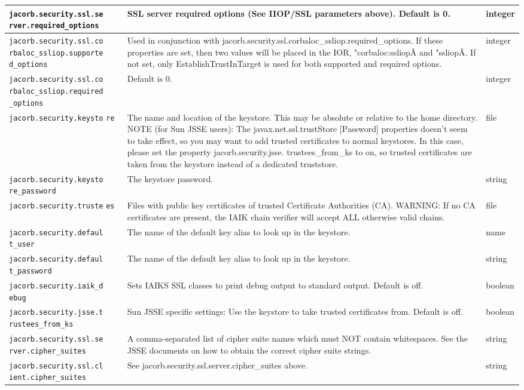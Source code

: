 \begin{small}
\begin{longtable}{|p{5cm}|p{9cm}|p{2cm}|}
\hline
\verb"jacorb.security.ssl.se"
\verb"rver.required_options" & SSL server required options (See IIOP/SSL parameters above). Default is 0. & integer \\
\hline
\verb"jacorb.security.ssl.co"
\verb"rbaloc_ssliop.supporte"
\verb"d_options" & Used in conjunction with jacorb.security.ssl.corbaloc\_ssliop.required\_options. If these properties are set, then two values will be placed in the IOR, "corbaloc:ssliopÂ and "ssliopÂ. If not set, only EstablishTrustInTarget is used for both supported and required options. & integer \\
\hline
\verb"jacorb.security.ssl.co"
\verb"rbaloc_ssliop.required"
\verb"_options" &  Default is 0. & integer \\
\hline
\verb"jacorb.security.keysto"
\verb"re" & The name and location of the keystore. This may be absolute or relative to the home directory. NOTE (for Sun JSSE users): The javax.net.ssl.trustStore [Password] properties doesn't seem to take effect, so you may want to add trusted certificates to normal keystores. In this case, please set the property jacorb.security.jsse. trustees\_from\_ks to on, so trusted certificates are taken from the keystore instead of a dedicated truststore.  & file \\
\hline
\verb"jacorb.security.keysto"
\verb"re_password" & The keystore password. & string \\
\hline
\verb"jacorb.security.truste"
\verb"es" & Files with public key certificates of trusted Certificate Authorities (CA). WARNING: If no CA certificates are present, the IAIK chain verifier will accept ALL otherwise valid chains. & file \\
\hline
\verb"jacorb.security.defaul"
\verb"t_user" & The name of the default key alias to look up in the keystore. & name \\
\hline
\verb"jacorb.security.defaul"
\verb"t_password" & The name of the default key alias to look up in the keystore. & string \\
\hline
\verb"jacorb.security.iaik_d"
\verb"ebug" & Sets IAIKS SSL classes to print debug output to standard output. Default is off. & boolean \\
\hline
\verb"jacorb.security.jsse.t"
\verb"rustees_from_ks" & Sun JSSE specific settings: Use the keystore to take trusted certificates from. Default is off. & boolean \\
\hline
\verb"jacorb.security.ssl.se"
\verb"rver.cipher_suites" & A comma-separated list of cipher suite names which must NOT contain whitespaces. See the JSSE documents on how to obtain the correct cipher suite strings. & string \\
\hline
\verb"jacorb.security.ssl.cl"
\verb"ient.cipher_suites" & See jacorb.security.ssl.server.cipher\_suites above. & string \\
\hline
\end{longtable}
\end{small}

